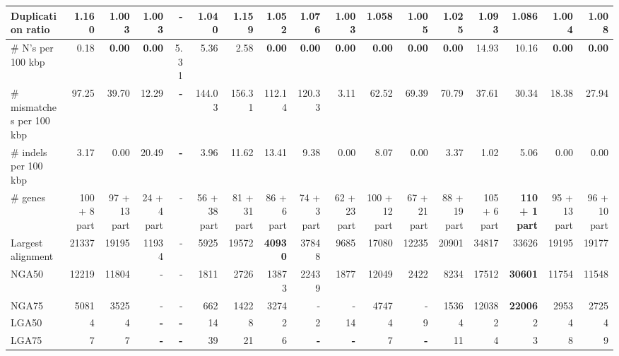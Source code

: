 \documentclass[12pt,a4paper]{article}
\begin{document}
\begin{table}[ht]
\begin{center}
\begin{tabular}{|l*{16}{|r}|}
Duplication ratio & 1.160 & 1.003 & 1.003 & {\bf -} & 1.040 & 1.159 & 1.052 & 1.076 & 1.003 & 1.058 & 1.005 & 1.025 & 1.093 & 1.086 & 1.004 & 1.008 \\ \hline
\# N's per 100 kbp & 0.18 & {\bf 0.00} & {\bf 0.00} & 5.31 & 5.36 & 2.58 & {\bf 0.00} & {\bf 0.00} & {\bf 0.00} & {\bf 0.00} & {\bf 0.00} & {\bf 0.00} & 14.93 & 10.16 & {\bf 0.00} & {\bf 0.00} \\ \hline
\# mismatches per 100 kbp & 97.25 & 39.70 & 12.29 & {\bf -} & 144.03 & 156.31 & 112.14 & 120.33 & 3.11 & 62.52 & 69.39 & 70.79 & 37.61 & 30.34 & 18.38 & 27.94 \\ \hline
\# indels per 100 kbp & 3.17 & 0.00 & 20.49 & {\bf -} & 3.96 & 11.62 & 13.41 & 9.38 & 0.00 & 8.07 & 0.00 & 3.37 & 1.02 & 5.06 & 0.00 & 0.00 \\ \hline
\# genes & 100 + 8 part & 97 + 13 part & 24 + 4 part & - & 56 + 38 part & 81 + 31 part & 86 + 6 part & 74 + 3 part & 62 + 23 part & 100 + 12 part & 67 + 21 part & 88 + 19 part & 105 + 6 part & {\bf 110 + 1 part} & 95 + 13 part & 96 + 10 part \\ \hline
Largest alignment & 21337 & 19195 & 11934 & - & 5925 & 19572 & {\bf 40930} & 37848 & 9685 & 17080 & 12235 & 20901 & 34817 & 33626 & 19195 & 19177 \\ \hline
NGA50 & 12219 & 11804 & - & - & 1811 & 2726 & 13873 & 22439 & 1877 & 12049 & 2422 & 8234 & 17512 & {\bf 30601} & 11754 & 11548 \\ \hline
NGA75 & 5081 & 3525 & - & - & 662 & 1422 & 3274 & - & - & 4747 & - & 1536 & 12038 & {\bf 22006} & 2953 & 2725 \\ \hline
LGA50 & 4 & 4 & {\bf -} & {\bf -} & 14 & 8 & 2 & 2 & 14 & 4 & 9 & 4 & 2 & 2 & 4 & 4 \\ \hline
LGA75 & 7 & 7 & {\bf -} & {\bf -} & 39 & 21 & 6 & {\bf -} & {\bf -} & 7 & {\bf -} & 11 & 4 & 3 & 8 & 9 \\ \hline
\end{tabular}
\end{center}
\end{table}
\end{document}
